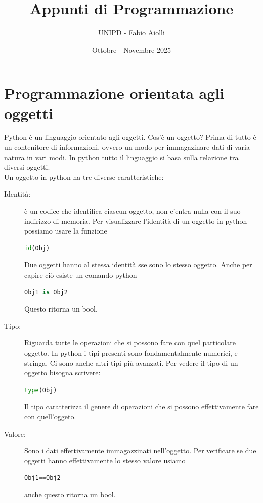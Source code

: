\documentclass[11pt]{scrartcl}
\begin{document}
	\title{Appunti di Programmazione}
	\subtitle{UNIPD - Fabio Aiolli}
	\date{Ottobre - Novembre 2025}
	
	
	\maketitle
	
	\tableofcontents
	
	\newpage
	
	
	
	\section{Programmazione orientata agli oggetti}
	Python è un linguaggio orientato agli oggetti. Cos'è un oggetto? Prima di tutto è un contenitore di informazioni, ovvero un modo per immagazinare dati di varia natura in vari modi. In python tutto il linguaggio si basa sulla relazione tra diversi oggetti. \\
	Un oggetto in python ha tre diverse caratteristiche:
	\begin{description}
		\item[Identità:] è un codice che identifica ciascun oggetto, non c'entra nulla con il suo indirizzo di memoria. Per visualizzare l'identità di un oggetto in python possiamo usare la funzione
		\begin{lstlisting}[language=Python]
			id(Obj)
		\end{lstlisting}
		Due oggetti hanno al stessa identità sse sono lo stesso oggetto. Anche per capire ciò esiste un comando python
		\begin{lstlisting}[language=Python]
			Obj1 is Obj2
		\end{lstlisting}
		Questo ritorna un bool.
		\item[Tipo:] Riguarda tutte le operazioni che si possono fare con quel particolare oggetto. In python i tipi presenti sono fondamentalmente numerici, e stringa. Ci sono anche altri tipi più avanzati. Per vedere il tipo di un oggetto bisogna scrivere:
		\begin{lstlisting}[language=Python]
			type(Obj)
		\end{lstlisting}
		Il tipo caratterizza il genere di operazioni che si possono effettivamente fare con quell'oggeto.
		\item[Valore:] Sono i dati effettivamente immagazzinati nell'oggetto. Per verificare se due oggetti hanno effettivamente lo stesso valore usiamo
		\begin{lstlisting}[language=Python]
			Obj1==Obj2
		\end{lstlisting}
		anche questo ritorna un bool. 
	\end{description}
\end{document}
